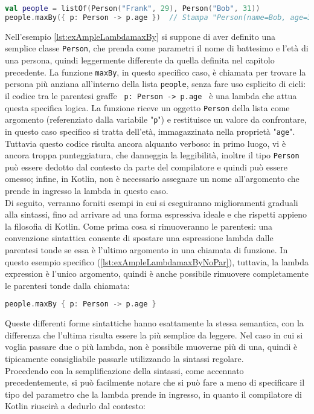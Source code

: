 \begin{lstlisting}[caption={La funzione \texttt{maxBy}}, captionpos=b, label={lst:exAmpleLambdamaxBy}, language=Kotlin]
val people = listOf(Person("Frank", 29), Person("Bob", 31))
people.maxBy({ p: Person -> p.age })  // Stampa "Person(name=Bob, age=31)"
\end{lstlisting}

Nell'esempio \ref{lst:exAmpleLambdamaxBy} si suppone di aver definito una semplice classe \texttt{Person}, che prenda come parametri il nome di battesimo e l'età di una persona, quindi leggermente differente da quella definita nel capitolo precedente. La funzione \texttt{maxBy}, in questo specifico caso, è chiamata per trovare la persona più anziana all’interno della lista \texttt{people}, senza fare uso esplicito di cicli: il codice tra le parentesi graffe \texttt{{ p: Person -> p.age }} è una lambda che attua questa specifica logica. La funzione riceve un oggetto \texttt{Person} della lista come argomento (referenziato dalla variabile "\texttt{p}") e restituisce un valore da confrontare, in questo caso specifico si tratta dell'età, immagazzinata nella proprietà "\texttt{age}". Tuttavia questo codice risulta ancora alquanto verboso: in primo luogo, vi è ancora troppa punteggiatura, che danneggia la leggibilità, inoltre il tipo \texttt{Person} può essere dedotto dal contesto da parte del compilatore e quindi può essere omesso; infine, in Kotlin, non è necessario assegnare un nome all'argomento che prende in ingresso la lambda in questo caso.\\
Di seguito, verranno forniti esempi in cui si eseguiranno miglioramenti graduali alla sintassi, fino ad arrivare ad una forma espressiva ideale e che rispetti appieno la filosofia di Kotlin. Come prima cosa si rimuoveranno le parentesi: una convenzione sintattica consente di spostare una espressione lambda dalle parentesi tonde se essa è l'ultimo argomento in una chiamata di funzione. In questo esempio specifico (\ref{lst:exAmpleLambdamaxByNoPar}), tuttavia, la lambda expression è l'unico argomento, quindi è anche possibile rimuovere completamente le parentesi tonde dalla chiamata:\\

\begin{lstlisting}[caption={Rimozione delle parentesi tonde}, captionpos=b, label={lst:exAmpleLambdamaxByNoPar}, language=Kotlin]
people.maxBy { p: Person -> p.age }
\end{lstlisting}

Queste differenti forme sintattiche hanno esattamente la stessa semantica, con la differenza che l'ultima risulta essere la più semplice da leggere. Nel caso in cui si voglia passare due o più lambda, non è possibile muoverne più di una, quindi è tipicamente consigliabile passarle utilizzando la sintassi regolare.\\
Procedendo con la semplificazione della sintassi, come accennato precedentemente, si può facilmente notare che si può fare a meno di specificare il tipo del parametro che la lambda prende in ingresso, in quanto il compilatore di Kotlin riuscirà a dedurlo dal contesto:\\


